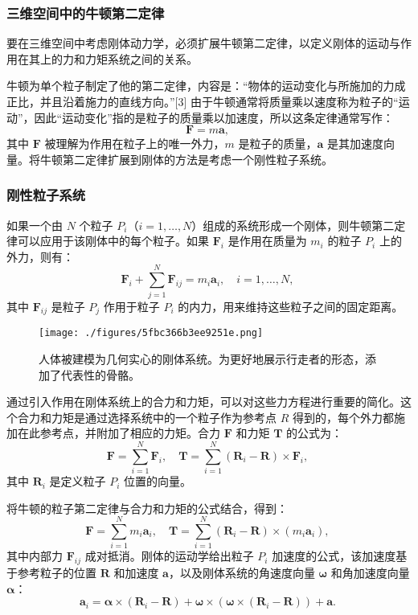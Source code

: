 \subsubsection{三维空间中的牛顿第二定律}  
要在三维空间中考虑刚体动力学，必须扩展牛顿第二定律，以定义刚体的运动与作用在其上的力和力矩系统之间的关系。

牛顿为单个粒子制定了他的第二定律，内容是：“物体的运动变化与所施加的力成正比，并且沿着施力的直线方向。”[3] 由于牛顿通常将质量乘以速度称为粒子的“运动”，因此“运动变化”指的是粒子的质量乘以加速度，所以这条定律通常写作：
\[
\mathbf{F} = m \mathbf{a},~
\]
其中 \( \mathbf{F} \) 被理解为作用在粒子上的唯一外力，\( m \) 是粒子的质量，\( \mathbf{a} \) 是其加速度向量。将牛顿第二定律扩展到刚体的方法是考虑一个刚性粒子系统。
\subsubsection{刚性粒子系统} 
如果一个由 \( N \) 个粒子 \( P_i \)（\( i=1, \dots, N \)）组成的系统形成一个刚体，则牛顿第二定律可以应用于该刚体中的每个粒子。如果 \( \mathbf{F}_i \) 是作用在质量为 \( m_i \) 的粒子 \( P_i \) 上的外力，则有：
\[
\mathbf{F}_i + \sum_{j=1}^{N} \mathbf{F}_{ij} = m_i \mathbf{a}_i, \quad i = 1, \dots, N,~
\]
其中 \( \mathbf{F}_{ij} \) 是粒子 \( P_j \) 作用于粒子 \( P_i \) 的内力，用来维持这些粒子之间的固定距离。
\begin{figure}[ht]
\centering
\texttt{[image: ./figures/5fbc366b3ee9251e.png]}
\caption{人体被建模为几何实心的刚体系统。为更好地展示行走者的形态，添加了代表性的骨骼。} \label{fig_GTDL_5}
\end{figure}
通过引入作用在刚体系统上的合力和力矩，可以对这些力方程进行重要的简化。这个合力和力矩是通过选择系统中的一个粒子作为参考点 \( R \) 得到的，每个外力都施加在此参考点，并附加了相应的力矩。合力 \( \mathbf{F} \) 和力矩 \( \mathbf{T} \) 的公式为：
\[
\mathbf{F} = \sum_{i=1}^{N} \mathbf{F}_{i}, \quad \mathbf{T} = \sum_{i=1}^{N} (\mathbf{R}_{i} - \mathbf{R}) \times \mathbf{F}_{i},~
\]
其中 \( \mathbf{R}_i \) 是定义粒子 \( P_i \) 位置的向量。

将牛顿的粒子第二定律与合力和力矩的公式结合，得到：
\[
\mathbf{F} = \sum_{i=1}^{N} m_{i} \mathbf{a}_{i}, \quad \mathbf{T} = \sum_{i=1}^{N} (\mathbf{R}_{i} - \mathbf{R}) \times (m_{i} \mathbf{a}_{i}),~
\]
其中内部力 \( \mathbf{F}_{ij} \) 成对抵消。刚体的运动学给出粒子 \( P_i \) 加速度的公式，该加速度基于参考粒子的位置 \( \mathbf{R} \) 和加速度 \( \mathbf{a} \)，以及刚体系统的角速度向量 \( \boldsymbol{\omega} \) 和角加速度向量 \( \boldsymbol{\alpha} \)：
\[
\mathbf{a}_{i} = \boldsymbol{\alpha} \times (\mathbf{R}_{i} - \mathbf{R}) + \boldsymbol{\omega} \times (\boldsymbol{\omega} \times (\mathbf{R}_{i} - \mathbf{R})) + \mathbf{a}.~
\]